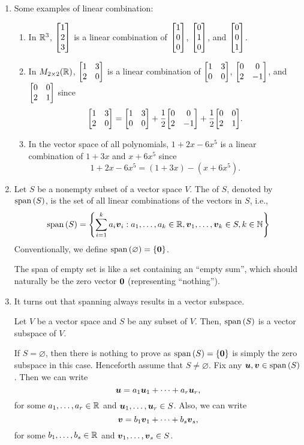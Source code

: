 \begin{enumerate}
\item Some examples of linear combination:
\begin{enumerate}
\item In \(\mathbb{R}^3\), \(\mqty[1\\2\\3]\) is a linear combination of
\(\mqty[1\\0\\0]\), \(\mqty[0\\1\\0]\), and \(\mqty[0\\0\\1]\).
\item In \(M_{2\times 2}(\mathbb{R})\), \(\mqty[1&3\\ 2&0]\) is a linear combination of
\(\mqty[1&3\\ 0&0]\), \(\mqty[0&0\\ 2&-1]\), and \(\mqty[0&0\\ 2&1]\) since
\[
\mqty[1&3\\ 2&0]=\mqty[1&3\\ 0&0]+\frac{1}{2}\mqty[0&0\\ 2&-1]+\frac{1}{2}\mqty[0&0\\ 2&1].
\]
\item In the vector space of all polynomials, \(1+2x-6x^5\) is a linear
combination of \(1+3x\) and \(x+6x^5\) since
\[
1+2x-6x^5=(1+3x)-(x+6x^5).
\]
\end{enumerate}
\item Let \(S\) be a nonempty subset of a vector space \(V\). The 
of \(S\), denoted by \(\operatorname{span}\qty(S)\), is the set of all linear
combinations of the vectors in \(S\), i.e.,
\[
\operatorname{span}\qty(S)=\qty{\sum_{i=1}^{k}a_i\vb*{v}_i:a_1,\dotsc,a_k\in\mathbb{R}, \vb*{v}_1,\dotsc,\vb*{v}_k\in S, k\in\mathbb{N}}
\]
Conventionally, we define \(\operatorname{span}\qty(\varnothing)=\{\vb*{0}\}\). \begin{intuition}
The span of empty set is like a set containing an ``empty sum'', which should
naturally be the zero vector \(\vb*{0}\) (representing ``nothing'').
\end{intuition}

\item It turns out that spanning always results in a vector subspace.
\begin{proposition}
\label{prp:span-vec-subsp}
Let \(V\) be a vector space and \(S\) be any subset of \(V\). Then, \(\operatorname{span}\qty(S)\)
is a vector subspace of \(V\).
\end{proposition}
\begin{pf}
If \(S=\varnothing\), then there is nothing to prove as
\(\operatorname{span}\qty(S)=\{\vb*{0}\}\) is simply the zero subspace in this case.
Henceforth assume that \(S\ne\varnothing\). Fix any
\(\vb*{u},\vb*{v}\in\operatorname{span}\qty(S)\). Then we can write
\[
\vb*{u}=a_1\vb*{u}_1+\dotsb+a_r\vb*{u}_r,
\]
for some \(a_1,\dotsc,a_r\in\mathbb{R}\) and \(\vb*{u}_1,\dotsc,\vb*{u}_r\in S\).
Also, we can write
\[
\vb*{v}=b_1\vb*{v}_1+\dotsb+b_s\vb*{v}_s,
\]
for some \(b_1,\dotsc,b_s\in\mathbb{R}\) and \(\vb*{v}_1,\dotsc,\vb*{v}_s\in S\).


\end{pf}
\end{enumerate}
